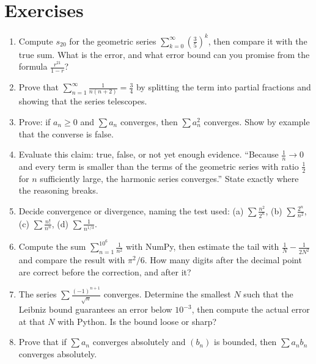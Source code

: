 \section{Exercises}

\begin{latihan}
\begin{enumerate}
\item Compute $s_{20}$ for the geometric series $\sum_{k=0}^{\infty}
      \left(\frac{3}{5}\right)^k$, then compare it with the true sum. What is the error,
      and what error bound can you promise from the formula $\frac{r^{21}}{1-r}$?

\item Prove that $\sum_{n=1}^{\infty} \frac{1}{n(n+2)} = \frac{3}{4}$ by splitting the
      term into partial fractions and showing that the series telescopes.

\item Prove: if $a_n \ge 0$ and $\sum a_n$ converges, then $\sum a_n^2$ converges. Show by
      example that the converse is false.

\item Evaluate this claim: true, false, or not yet enough evidence. ``Because
      $\frac{1}{n} \to 0$ and every term is smaller than the terms of the geometric series
      with ratio $\frac{1}{2}$ for $n$ sufficiently large, the harmonic series converges.''
      State exactly where the reasoning breaks.

\item Decide convergence or divergence, naming the test used:
      (a) $\sum \frac{n^2}{2^n}$, (b) $\sum \frac{2^n}{n^2}$,
      (c) $\sum \frac{n!}{n^n}$, (d) $\sum \frac{1}{n^{1/3}}$.

\item Compute the sum $\sum_{n=1}^{10^6} \frac{1}{n^2}$ with NumPy, then estimate the tail
      with $\frac{1}{N} - \frac{1}{2N^2}$ and compare the result with $\pi^2/6$. How many
      digits after the decimal point are correct before the correction, and after it?

\item The series $\sum \frac{(-1)^{n+1}}{\sqrt{n}}$ converges. Determine the smallest $N$
      such that the Leibniz bound guarantees an error below $10^{-3}$, then compute the
      actual error at that $N$ with Python. Is the bound loose or sharp?

\item Prove that if $\sum a_n$ converges absolutely and $(b_n)$ is bounded, then
      $\sum a_n b_n$ converges absolutely.


\end{enumerate}
\end{latihan}
